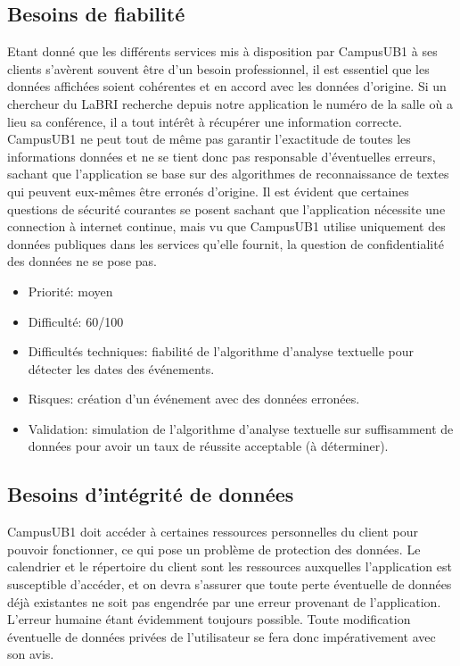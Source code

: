 \documentclass [pdftex,12pt] {report}
\begin{document}
\subsection{Besoins de fiabilité}
Etant donné que les différents services mis à disposition par CampusUB1 à ses clients s'avèrent souvent être d'un besoin professionnel, il est essentiel que les données affichées soient cohérentes et en accord avec les données d'origine. Si un chercheur du LaBRI recherche depuis notre application le numéro de la salle où a lieu sa conférence, il a tout intérêt à récupérer une information correcte. CampusUB1 ne peut tout de même pas garantir l'exactitude de toutes les informations données et ne se tient donc pas responsable d'éventuelles erreurs, sachant que l'application se base sur des algorithmes de reconnaissance de textes qui peuvent eux-mêmes être erronés d'origine. Il est évident que certaines questions de sécurité courantes se posent sachant que l'application nécessite une connection à internet continue, mais vu que CampusUB1 utilise uniquement des données publiques dans les services qu'elle fournit, la question de confidentialité des données ne se pose pas. \\

\begin{itemize}
\renewcommand{\labelitemi}{$\bullet$}
\item Priorité: moyen
\item Difficulté: 60/100
\item Difficultés techniques: fiabilité de l'algorithme d'analyse textuelle pour détecter les dates des événements.
\item Risques: création d'un événement avec des données erronées.
\item Validation: simulation de l'algorithme d'analyse textuelle sur suffisamment de données pour avoir un taux de réussite acceptable (à déterminer).
\end{itemize}  

\subsection{Besoins d'intégrité de données}
CampusUB1 doit accéder à certaines ressources personnelles du client pour pouvoir fonctionner, ce qui pose un problème de protection des données. Le calendrier et le répertoire du client sont les ressources auxquelles l'application est susceptible d'accéder, et on devra s'assurer que toute perte éventuelle de données déjà existantes ne soit pas engendrée par une erreur provenant de l'application. L'erreur humaine étant évidemment toujours possible. Toute modification éventuelle de données privées de l'utilisateur se fera donc impérativement avec son avis. \\
\end{document}
